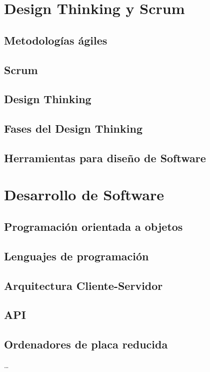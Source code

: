 \section{Design Thinking y Scrum}

\subsection{Metodologías ágiles}

\subsection{Scrum}

\subsection{Design Thinking}

\subsection{Fases del Design Thinking}

\subsection{Herramientas para diseño de Software}

\section{Desarrollo de Software}

\subsection{Programación orientada a objetos}

\subsection{Lenguajes de programación}

\subsection{Arquitectura Cliente-Servidor}

\subsection{API}

\subsection{Ordenadores de placa reducida}

 \ldots 

 




